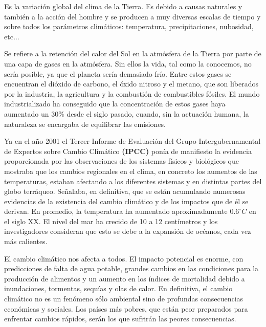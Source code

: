 \begin{definition}
	Es la variación global del clima de la Tierra. Es debido
	a causas naturales y también a la acción del hombre y se producen a muy diversas
	escalas de tiempo y sobre todos los parámetros climáticos: temperatura,
	precipitaciones, nubosidad, etc$\dots$
\end{definition}

\begin{definition}
	Se refiere a la retención del calor del Sol en la atmósfera de la Tierra por parte de una capa de gases
	en la atmósfera. Sin ellos la vida, tal como la conocemos, no sería posible, ya que el
	planeta sería demasiado frío. Entre estos gases se encuentran el dióxido de carbono,
	el óxido nitroso y el metano, que son liberados por la industria, la agricultura y la
	combustión de combustibles fósiles. El mundo industrializado ha conseguido que la concentración de estos gases haya aumentado un 30\% desde el siglo pasado, cuando,
	sin la actuación humana, la naturaleza se encargaba de equilibrar las emisiones.
\end{definition}

Ya en el año 2001 el Tercer Informe de Evaluación del Grupo Intergubernamental
de Expertos sobre Cambio Climático \textbf{(IPCC)} ponía de manifiesto la evidencia
proporcionada por las observaciones de los sistemas físicos y biológicos que mostraba
que los cambios regionales en el clima, en concreto los aumentos de las temperaturas,
estaban afectando a los diferentes sistemas y en distintas partes del globo terráqueo.
Señalaba, en definitiva, que se están acumulando numerosas evidencias de la
existencia del cambio climático y de los impactos que de él se derivan. En promedio, la
temperatura ha aumentado aproximadamente $0{.}6^\circ C$ en el siglo XX. El nivel del mar ha
crecido de 10 a 12 centímetros y los investigadores consideran que esto se debe a la
expansión de océanos, cada vez más calientes.

El cambio climático nos afecta a todos. El impacto potencial es enorme, con
predicciones de falta de agua potable, grandes cambios en las condiciones para la
producción de alimentos y un aumento en los índices de mortalidad debido a
inundaciones, tormentas, sequías y olas de calor. En definitiva, el cambio climático no
es un fenómeno sólo ambiental sino de profundas consecuencias económicas y
sociales. Los países más pobres, que están peor preparados para enfrentar cambios
rápidos, serán los que sufrirán las peores consecuencias.

